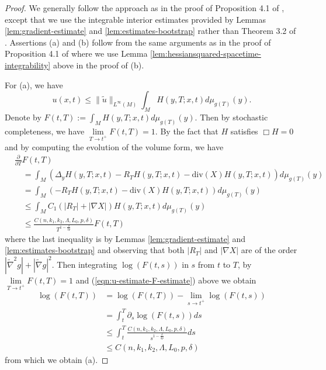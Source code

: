\documentclass[12pt]{amsart}
\newcommand{\del}{\nabla}
\newcommand{\hdel}{\tilde{\nabla}}
\theoremstyle{remark}
\numberwithin{equation}{section}
\begin{document}
\begin{proof}
    We generally follow the approach as in the proof of Proposition 4.1 of \cite{jiang_weak_2021}, except that we use the integrable interior estimates provided by Lemmas \ref{lem:gradient-estimate} and \ref{lem:estimates-bootstrap} rather than Theorem 3.2 of \cite{jiang_weak_2021}. Assertions (a) and (b) follow from the same arguments as in the proof of Proposition 4.1 of \cite{jiang_weak_2021} where we use Lemma \ref{lem:hessiansquared-spacetime-integrability} above in the proof of (b).

    For (a), we have
    \begin{equation*}
        u(x,t) \leq \lVert\tilde{u}\rVert_{L^\infty(M)}\int_M H(y,T;x,t)d\mu_{g(T)}(y).
    \end{equation*}
    Denote by $F(t,T):= \int_M H(y,T;x,t)d\mu_{g(T)}(y)$. Then by stochastic completeness, we have $\lim\limits_{T\to t^+}F(t,T) = 1$. By the fact that $H$ satisfies $\Box H = 0$ and by computing the evolution of the volume form, we have
    \begin{align}\label{eqn:u-estimate-F-estimate}
        &\frac{\partial}{\partial T} F(t,T) \nonumber \\
        &\quad= \int_M\left(\Delta_yH(y,T;x,t) - R_TH(y,T;x,t) - \text{div}(X)H(y,T;x,t)\right)d\mu_{g(T)}(y) \nonumber \\
        &\quad= \int_M \left(-R_TH(y,T;x,t)-\text{div}(X)H(y,T;x,t)\right)d\mu_{g(T)}(y) \nonumber \\
        &\quad\leq \int_M C_1\left(|R_T| + |\del X|\right)H(y,T;x,t)d\mu_{g(T)}(y) \nonumber \\
        &\quad\leq \frac{C(n,k_1,k_2,\Lambda,L_0,p,\delta)}{T^{1-\frac{\delta}{2p}}}F(t,T)
    \end{align}
    where the last inequality is by Lemmas \ref{lem:gradient-estimate} and \ref{lem:estimates-bootstrap} and observing that both $|R_T|$ and $|\del X|$ are of the order $|\hdel^2 g| + |\hdel g|^2$. Then integrating $\log(F(t,s))$ in $s$ from $t$ to $T$, by $\lim\limits_{T\to t^+}F(t,T) = 1$ and (\ref{eqn:u-estimate-F-estimate}) above we obtain
    \begin{align*}
        \log(F(t,T)) &= \log(F(t,T)) - \lim\limits_{s\to t^+}\log(F(t,s)) \nonumber \\
        &= \int_t^T \partial_s \log(F(t,s))ds \nonumber \\
        &\leq \int_t^T \frac{C(n,k_1,k_2,\Lambda,L_0,p,\delta)}{s^{1-\frac{\delta}{2p}}}ds \nonumber \\
        &\leq C(n,k_1,k_2,\Lambda,L_0,p,\delta)
    \end{align*}
    from which we obtain (a).


\end{proof}
\end{document}
